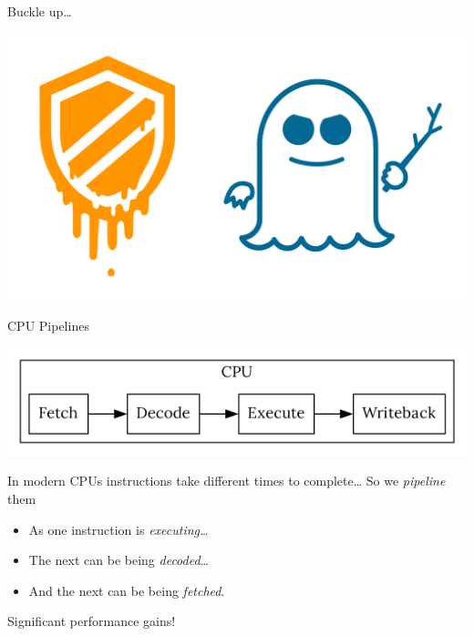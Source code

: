 \documentclass[9pt,aspectratio=169]{beamer}
\begin{document}
\begin{frame}[label={sec:org4fa2ac1}]{Buckle up\ldots{}}
\begin{center}
\includegraphics[width=\linewidth]{./brandnames.png}
\end{center}
\end{frame}

\begin{frame}[label={sec:org16ba655}]{CPU Pipelines}
\begin{center}
\includegraphics[width=\linewidth]{pipelines.png}
\end{center}

\begin{block}{In modern CPUs instructions take different times to complete\ldots{}}
So we \emph{pipeline} them
\begin{itemize}
\item As one instruction is \emph{executing\ldots{}}
\item The next can be being \emph{decoded}\ldots{}
\item And the next can be being \emph{fetched}.
\end{itemize}

Significant performance gains!
\end{block}
\end{frame}
\end{document}
